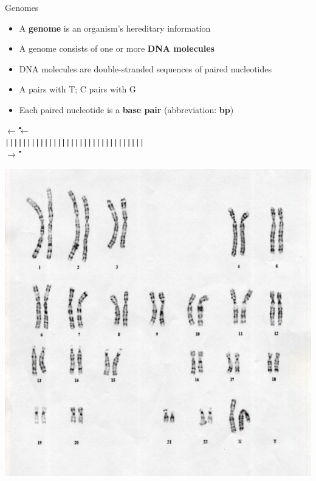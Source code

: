 \documentclass[xcolor=dvipsnames]{beamer}
\begin{document}
\begin{frame}{Genomes}
    \begin{minipage}{0.75\textwidth}
        \begin{itemize}
            \item A {\bf genome} is an organism's hereditary information
            \item A genome consists of one or more {\bf DNA molecules}
            \item DNA molecules are double-stranded sequences of paired
                  nucleotides
            \item A pairs with T; C pairs with G
            \item Each paired nucleotide is a {\bf base pair} (abbreviation: {\bf bp})
        \end{itemize}
            \begin{center}
                {\tt {\bf $\leftarrow$}\G{}\T{}\T{}\G{}\C{}\T{}\A{}\T{}\A{}\A{}\A{}\T{}\A{}\C{}\G{}\G{}\G{}\T{}\C{}\A{}\T{}\G{}\G{}\T{}\A{}\T{}\T{}\T{}\A{}\C{}\C{}\G{}{\bf $\leftarrow$}} \\
                \vspace{-0.14cm}
                {\tt                     ||||||||||||||||||||||||||||||||} \\
                \vspace{-0.14cm}
                {\tt {\bf $\rightarrow$}\C{}\A{}\A{}\C{}\G{}\A{}\T{}\A{}\T{}\T{}\T{}\A{}\T{}\G{}\C{}\C{}\C{}\A{}\G{}\T{}\A{}\C{}\C{}\A{}\T{}\A{}\A{}\A{}\T{}\G{}\G{}\C{}{\bf $\rightarrow$}}
            \end{center}
    \end{minipage}
    \begin{minipage}{0.23\textwidth}
        \includegraphics[width=1.0\textwidth]{HumanKaryotype.jpg} \\

\end{minipage}
\end{frame}
\end{document}
